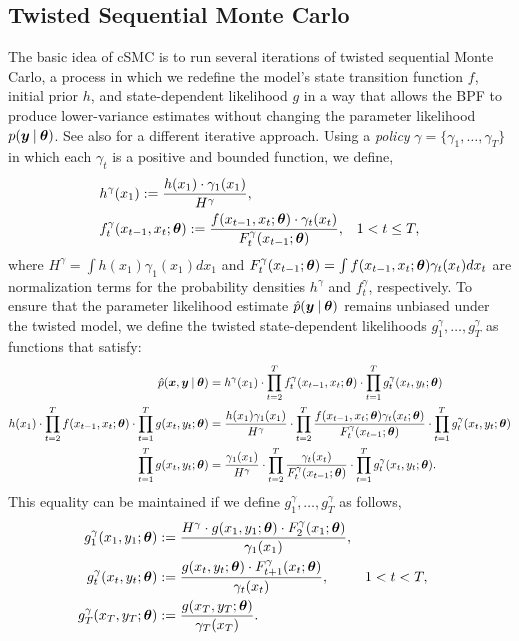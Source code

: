 \documentclass{article}
\begin{document}
\subsection{Twisted Sequential Monte Carlo}
The basic idea of cSMC is to run several iterations of twisted sequential Monte Carlo, a process in which we redefine the model's state transition function $f$, initial prior $h$, and state-dependent likelihood $g$ in a way that allows the BPF to produce lower-variance estimates without changing the parameter likelihood $p(\boldsymbol{y} \:\vert\: \boldsymbol{\theta})$. See also \cite{guarniero2017iterated} for a different iterative approach. Using a \emph{policy} $\gamma = \{\gamma_1, \ldots, \gamma_T\}$ in which each $\gamma_t$ is a positive and bounded function, we define,
\begin{align*}
&h^\gamma(x_1) := \frac{h(x_1) \cdot \gamma_1(x_1)}{H^\gamma}, & & \\
&f^\gamma_t(x_{t-1}, x_{t}; \boldsymbol{\theta}) := \frac{f(x_{t-1}, x_t; \boldsymbol{\theta}) \cdot \gamma_t(x_t)}{F^\gamma_t(x_{t-1}; \boldsymbol{\theta})}, & & 1 < t \leq T,
\end{align*}
where $H^\gamma = \int h(x_1) \gamma_1(x_1) dx_1$ and $F^\gamma_t(x_{t-1}; \boldsymbol{\theta}) = \int f(x_{t-1}, x_t; \boldsymbol{\theta})\gamma_t(x_t) dx_t$ are normalization terms for the probability densities $h^\gamma$ and $f^\gamma_t$, respectively.  To ensure that the parameter likelihood estimate $\hat{p}(\boldsymbol{y} \:\vert\: \boldsymbol{\theta})$ remains unbiased under the twisted model, we define the twisted state-dependent likelihoods $g_1^\gamma, \ldots, g_T^\gamma$ as functions that satisfy:
\begin{align*}
\hat{p}(\boldsymbol{x}, \boldsymbol{y} \:\vert\: \boldsymbol{\theta}) &= h^\gamma(x_1) \cdot \prod_{t=2}^T f^\gamma_t(x_{t-1}, x_t; \boldsymbol{\theta}) \cdot \prod_{t=1}^T g^\gamma_t(x_t, y_t; \boldsymbol{\theta}) \\
h(x_1) \cdot \prod_{t=2}^T f(x_{t-1}, x_t; \boldsymbol{\theta}) \cdot \prod_{t=1}^T g(x_t, y_t; \boldsymbol{\theta}) &= \frac{h(x_1) \gamma_1(x_1)}{H^\gamma} \cdot \prod_{t=2}^T \frac{f(x_{t-1}, x_t; \boldsymbol{\theta})\gamma_t(x_t; \boldsymbol{\theta}) }{F^\gamma_t(x_{t-1}; \boldsymbol{\theta})} \cdot \prod_{t=1}^T g^\gamma_t(x_t, y_t; \boldsymbol{\theta}) \\
\prod_{t=1}^T g(x_t, y_t; \boldsymbol{\theta}) &= \frac{\gamma_1(x_1)}{H^\gamma} \cdot \prod_{t=2}^T \frac{\gamma_t(x_t) }{F^\gamma_t(x_{t-1}; \boldsymbol{\theta})} \cdot \prod_{t=1}^T g^\gamma_t(x_t, y_t; \boldsymbol{\theta}).
\end{align*}
This equality can be maintained if we define $g^\gamma_1, \ldots, g^\gamma_T$ as follows,
\begin{align*}
g^\gamma_1(x_1, y_1; \boldsymbol{\theta}) &:= \frac{H^\gamma \cdot g(x_1, y_1; \boldsymbol{\theta}) \cdot F^\gamma_2(x_1; \boldsymbol{\theta})}{\gamma_1(x_1)}, \\
g^\gamma_t(x_t, y_t; \boldsymbol{\theta}) &:= \frac{g(x_t, y_t; \boldsymbol{\theta}) \cdot F^\gamma_{t+1}(x_t; \boldsymbol{\theta})}{\gamma_t(x_t)}, & & 1 < t < T, \\
g^\gamma_T(x_T, y_T; \boldsymbol{\theta}) &:= \frac{g(x_T, y_T; \boldsymbol{\theta})}{\gamma_T(x_T)}.
\end{align*}
\end{document}
